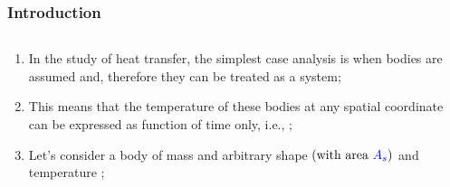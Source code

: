 \documentclass[10pt,compress,handout,unknownkeysallowed]{beamer}
\begin{document}
\begin{frame}
 \frametitle{Introduction}
   \begin{columns}
     \begin{column}[l]{0.5\linewidth}
         \begin{center}
         \end{center}
     \end{column}
     \begin{column}[l]{0.5\linewidth}
         \begin{flushleft}
         \end{flushleft}
     \end{column}         
   \end{columns}
%
        \begin{enumerate}
           \item<1-> In the study of heat transfer, the simplest case analysis is when bodies are assumed  and, therefore they can be treated as a  system;
           \item<2-> This means that the temperature of these bodies at any spatial coordinate can be expressed as function of time only, i.e., ; 
           \item<4-> Let's consider a body of mass  and arbitrary shape $\left(\text{with area } \textcolor{blue}{A_{s}}\right)$ and temperature ;
        \end{enumerate}
\end{frame}
\end{document}
